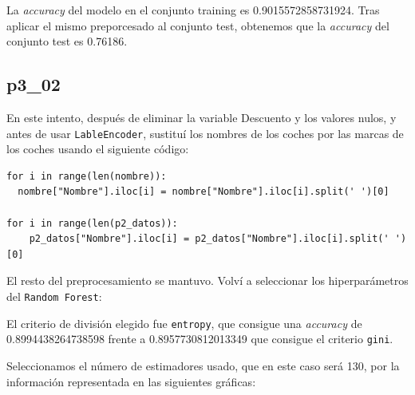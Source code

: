 \documentclass[a4]{article}
\begin{document}
La \textit{accuracy} del modelo en el conjunto training es 0.9015572858731924. Tras aplicar el mismo preporcesado al conjunto test, obtenemos que la \textit{accuracy} del conjunto test es 0.76186.

\subsection{p3\_02}

En este intento, después de eliminar la variable Descuento y los valores nulos, y antes de usar \texttt{LableEncoder}, sustituí los nombres de los coches por las marcas de los coches usando el siguiente código:

\begin{lstlisting}
for i in range(len(nombre)):
  nombre["Nombre"].iloc[i] = nombre["Nombre"].iloc[i].split(' ')[0]

for i in range(len(p2_datos)):
    p2_datos["Nombre"].iloc[i] = p2_datos["Nombre"].iloc[i].split(' ')[0]
\end{lstlisting}

El resto del preprocesamiento se mantuvo. Volví a seleccionar los hiperparámetros del \texttt{Random Forest}:

El criterio de división elegido fue \texttt{entropy}, que consigue una \textit{accuracy} de 0.8994438264738598 frente a 0.8957730812013349 que consigue el criterio \texttt{gini}.

Seleccionamos el número de estimadores usado, que en este caso será 130, por la información representada en las siguientes gráficas:

\begin{figure}[H]
  \centering
\end{figure}
\end{document}
